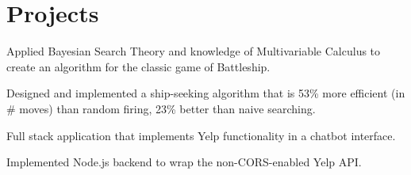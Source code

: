 \documentclass[]{deedy-resume-openfont}
\begin{document}
\begin{minipage}[t]{0.66\textwidth}

%
%


\section{Projects}
\begin{tightemize}
\item Applied Bayesian Search Theory and knowledge of Multivariable Calculus to create an algorithm for the classic game of Battleship. 
\item Designed and implemented a ship-seeking algorithm that is 53\% more efficient (in \# moves) than random firing, 23\% better than naive searching.
\end{tightemize}

\sectionsep
{}
\begin{tightemize}
\item Full stack application that implements Yelp functionality in a chatbot interface. 
\item Implemented Node.js backend to wrap the non-CORS-enabled Yelp API. 
\end{tightemize}
\sectionsep




\end{minipage}
\end{document}
